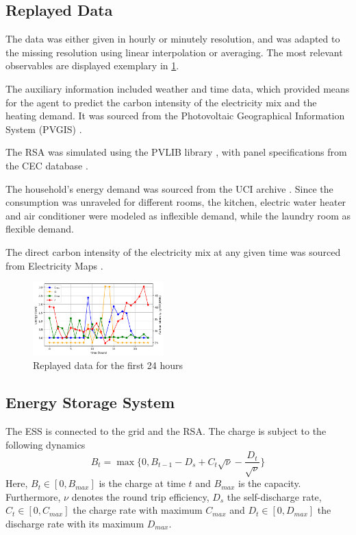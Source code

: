 \subsection{Replayed Data}\label{ssec:static_components}
The data was either given in hourly or minutely resolution, and was adapted to the missing resolution using linear interpolation or averaging. The most relevant observables are displayed exemplary in \cref{fig:static_components}.
\par
The auxiliary information included weather and time data, which provided means for the agent to predict the carbon intensity of the electricity mix and the heating demand. It was sourced from the Photovoltaic Geographical Information System (PVGIS) \cite{ThomasHuld.2012}.
\par
The RSA was simulated using the PVLIB library \cite{F.Holmgren.2018}, with panel specifications from the CEC database \cite{Dobos.2012}\cite{Boyson.2007}.
\par
The household's energy demand was sourced from the UCI archive \cite{GeorgesHebrail.2006}. Since the consumption was unraveled for different rooms, the kitchen, electric water heater and air conditioner were modeled as inflexible demand, while the laundry room as flexible demand.
\par
The direct carbon intensity of the electricity mix at any given time was sourced from Electricity Maps \cite{.29.12.2023}. 
\begin{figure}[H]
    \centering
    \setlength{\abovecaptionskip}{0pt}
    \includegraphics[width=0.45\textwidth]{figures/static_components.png}
    \caption{Replayed data for the first 24 hours}
    \label{fig:static_components}
\end{figure}

\subsection{Energy Storage System}
The ESS is connected to the grid and the RSA. The charge is subject to the following dynamics
\begin{equation}
    B_t = \max\{0, B_{t-1} - D_s + C_t \sqrt{\nu} - \frac{D_t}{\sqrt{\nu}}\}
\end{equation}
Here, $B_t \in [0, B_{max}]$ is the charge at time $t$ and $B_{max}$ is the capacity. Furthermore, $\nu$ denotes the round trip efficiency, $D_s$ the self-discharge rate, $C_t \in [0, C_{max}]$ the charge rate with maximum $C_{max}$ and $D_t \in [0, D_{max}]$ the discharge rate with its maximum  $D_{max}$. 

